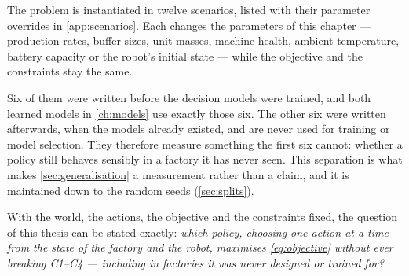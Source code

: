 The problem is instantiated in twelve scenarios, listed with their parameter overrides in
\cref{app:scenarios}. Each changes the parameters of this chapter --- production rates, buffer
sizes, unit masses, machine health, ambient temperature, battery capacity or the robot's initial
state --- while the objective and the constraints stay the same.

Six of them were written before the decision models were trained, and both learned models in
\cref{ch:models} use exactly those six. The other six were written afterwards, when the models
already existed, and are never used for training or model selection. They therefore measure
something the first six cannot: whether a policy still behaves sensibly in a factory it has never
seen. This separation is what makes \cref{sec:generalisation} a measurement rather than a claim,
and it is maintained down to the random seeds (\cref{sec:splits}).

With the world, the actions, the objective and the constraints fixed, the question of this thesis
can be stated exactly: \emph{which policy, choosing one action at a time from the state of the
factory and the robot, maximises \cref{eq:objective} without ever breaking C1--C4 --- including in
factories it was never designed or trained for?}
